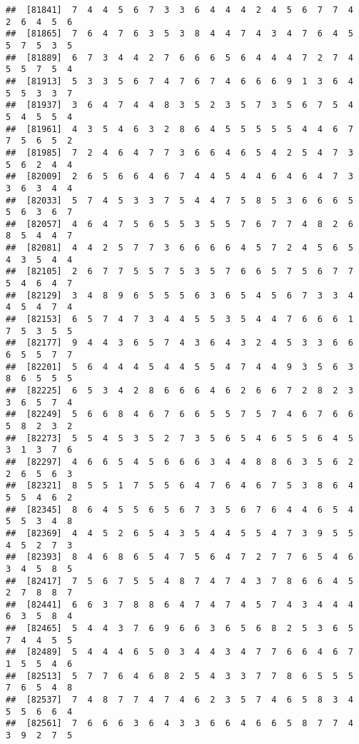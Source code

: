 \documentclass[
]{book}
\begin{document}
\begin{verbatim}
##  [81841]  7  4  4  5  6  7  3  3  6  4  4  4  2  4  5  6  7  7  4  2  6  4  5  6
##  [81865]  7  6  4  7  6  3  5  3  8  4  4  7  4  3  4  7  6  4  5  5  7  5  3  5
##  [81889]  6  7  3  4  4  2  7  6  6  6  5  6  4  4  4  7  2  7  4  5  5  7  5  4
##  [81913]  5  3  3  5  6  7  4  7  6  7  4  6  6  6  9  1  3  6  4  5  5  3  3  7
##  [81937]  3  6  4  7  4  4  8  3  5  2  3  5  7  3  5  6  7  5  4  5  4  5  5  4
##  [81961]  4  3  5  4  6  3  2  8  6  4  5  5  5  5  5  4  4  6  7  7  5  6  5  2
##  [81985]  7  2  4  6  4  7  7  3  6  6  4  6  5  4  2  5  4  7  3  5  6  2  4  4
##  [82009]  2  6  5  6  6  4  6  7  4  4  5  4  4  6  4  6  4  7  3  3  6  3  4  4
##  [82033]  5  7  4  5  3  3  7  5  4  4  7  5  8  5  3  6  6  6  5  5  6  3  6  7
##  [82057]  4  6  4  7  5  6  5  5  3  5  5  7  6  7  7  4  8  2  6  8  5  4  4  7
##  [82081]  4  4  2  5  7  7  3  6  6  6  6  4  5  7  2  4  5  6  5  4  3  5  4  4
##  [82105]  2  6  7  7  5  5  7  5  3  5  7  6  6  5  7  5  6  7  7  5  4  6  4  7
##  [82129]  3  4  8  9  6  5  5  5  6  3  6  5  4  5  6  7  3  3  4  4  5  4  7  4
##  [82153]  6  5  7  4  7  3  4  4  5  5  3  5  4  4  7  6  6  6  1  7  5  3  5  5
##  [82177]  9  4  4  3  6  5  7  4  3  6  4  3  2  4  5  3  3  6  6  6  5  5  7  7
##  [82201]  5  6  4  4  4  5  4  4  5  5  4  7  4  4  9  3  5  6  3  8  6  5  5  5
##  [82225]  6  5  3  4  2  8  6  6  6  4  6  2  6  6  7  2  8  2  3  3  6  5  7  4
##  [82249]  5  6  6  8  4  6  7  6  6  5  5  7  5  7  4  6  7  6  6  5  8  2  3  2
##  [82273]  5  5  4  5  3  5  2  7  3  5  6  5  4  6  5  5  6  4  5  3  1  3  7  6
##  [82297]  4  6  6  5  4  5  6  6  6  3  4  4  8  8  6  3  5  6  2  2  6  5  6  3
##  [82321]  8  5  5  1  7  5  5  6  4  7  6  4  6  7  5  3  8  6  4  5  5  4  6  2
##  [82345]  8  6  4  5  5  6  5  6  7  3  5  6  7  6  4  4  6  5  4  5  5  3  4  8
##  [82369]  4  4  5  2  6  5  4  3  5  4  4  5  5  4  7  3  9  5  5  4  5  2  7  3
##  [82393]  8  4  6  8  6  5  4  7  5  6  4  7  2  7  7  6  5  4  6  3  4  5  8  5
##  [82417]  7  5  6  7  5  5  4  8  7  4  7  4  3  7  8  6  6  4  5  2  7  8  8  7
##  [82441]  6  6  3  7  8  8  6  4  7  4  7  4  5  7  4  3  4  4  4  6  3  5  8  4
##  [82465]  5  4  4  3  7  6  9  6  6  3  6  5  6  8  2  5  3  6  5  7  4  4  5  5
##  [82489]  5  4  4  4  6  5  0  3  4  4  3  4  7  7  6  6  4  6  7  1  5  5  4  6
##  [82513]  5  7  7  6  4  6  8  2  5  4  3  3  7  7  8  6  5  5  5  7  6  5  4  8
##  [82537]  7  4  8  7  7  4  7  4  6  2  3  5  7  4  6  5  8  3  4  5  5  6  6  4
##  [82561]  7  6  6  6  3  6  4  3  3  6  6  4  6  6  5  8  7  7  4  3  9  2  7  5

\end{verbatim}
\end{document}
